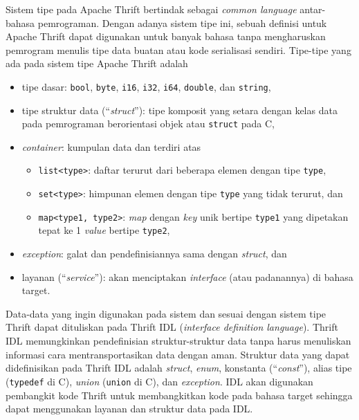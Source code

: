Sistem tipe pada Apache Thrift bertindak sebagai \textit{common language}
antar-bahasa pemrograman. Dengan adanya sistem tipe ini, sebuah definisi untuk
Apache Thrift dapat digunakan untuk banyak bahasa tanpa mengharuskan pemrogram
menulis tipe data buatan atau kode serialisasi sendiri. Tipe-tipe yang ada pada
sistem tipe Apache Thrift adalah \parencite{agarwal_thrift}
\begin{itemize}
    \item tipe dasar: \texttt{bool}, \texttt{byte}, \texttt{i16},
          \texttt{i32}, \texttt{i64}, \texttt{double}, dan \texttt{string},
    \item tipe struktur data (``\textit{struct}''): tipe komposit yang setara
          dengan kelas data pada pemrograman berorientasi objek atau \texttt{struct}
          pada C,
    \item \textit{container}: kumpulan data dan terdiri atas
          \begin{itemize}
              \item \texttt{list<type>}: daftar terurut dari beberapa elemen
                    dengan tipe \texttt{type},
              \item \texttt{set<type>}: himpunan elemen dengan tipe
                    \texttt{type} yang tidak terurut, dan
              \item \texttt{map<type1, type2>}: \textit{map} dengan \textit{key}
                    unik bertipe \texttt{type1} yang di\-pe\-ta\-kan tepat ke 1
                    \textit{value} bertipe \texttt{type2},
          \end{itemize}
    \item \textit{exception}: galat dan pendefinisiannya sama dengan
          \textit{struct}, dan
    \item layanan (``\textit{service}''): akan menciptakan \textit{interface}
          (atau padanannya) di bahasa target.
\end{itemize}

Data-data yang ingin digunakan pada sistem dan sesuai dengan sistem tipe Thrift
dapat dituliskan pada Thrift IDL (\textit{interface definition language}).
Thrift IDL memungkinkan pendefinisian struktur-struktur data tanpa harus
menuliskan informasi cara mentransportasikan data dengan aman. Struktur data
yang dapat didefinisikan pada Thrift IDL adalah \textit{struct}, \textit{enum},
konstanta (``\textit{const}''), alias tipe (\texttt{typedef} di C), \textit{union}
(\texttt{union} di C), dan \textit{exception}. IDL akan digunakan pembangkit
kode Thrift untuk membangkitkan kode pada bahasa target sehingga dapat
menggunakan layanan dan struktur data pada IDL.

